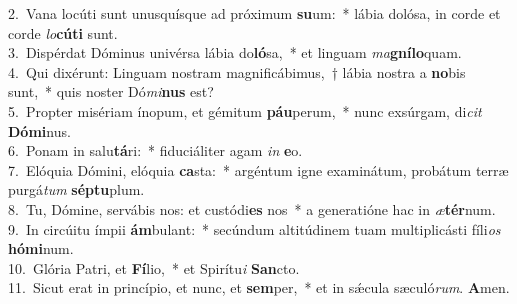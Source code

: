 {2.~}Vana locúti sunt unusquísque ad próximum \textbf{su}um:~* lábia dolósa, in corde et corde \textit{lo}\textbf{cú}\textbf{ti} sunt.\\
{3.~}Dispérdat Dóminus univérsa lábia do\textbf{ló}sa,~* et linguam \textit{ma}\textbf{gní}\textbf{lo}quam.\\
{4.~}Qui dixérunt: Linguam nostram magnificábimus,~† lábia nostra a \textbf{no}bis sunt,~* quis noster Dó\textit{mi}\textbf{nus} est?\\
{5.~}Propter misériam ínopum, et gémitum \textbf{páu}perum,~* nunc exsúrgam, di\textit{cit} \textbf{Dó}\textbf{mi}nus.\\
{6.~}Ponam in salu\textbf{tá}ri:~* fiduciáliter agam \textit{in} \textbf{e}o.\\
{7.~}Elóquia Dómini, elóquia \textbf{ca}sta:~* argéntum igne examinátum, probátum terræ purgá\textit{tum} \textbf{sép}\textbf{tu}plum.\\
{8.~}Tu, Dómine, servábis nos: et custódi\textbf{es} nos~* a generatióne hac in \textit{æ}\textbf{tér}num.\\
{9.~}In circúitu ímpii \textbf{ám}bulant:~* secúndum altitúdinem tuam multiplicásti fíli\textit{os} \textbf{hó}\textbf{mi}num.\\
{10.~}Glória Patri, et \textbf{Fí}lio,~* et Spirítu\textit{i} \textbf{San}cto.\\
{11.~}Sicut erat in princípio, et nunc, et \textbf{sem}per,~* et in sǽcula sæculó\textit{rum}. \textbf{A}men.\\
